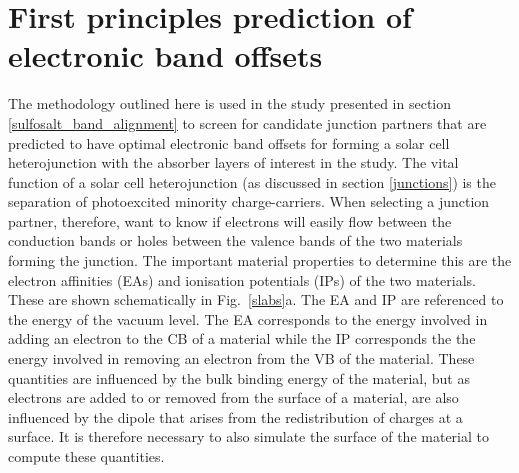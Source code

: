 \documentclass[11pt, twoside]{report}
\begin{document}
\section{First principles prediction of electronic band offsets}\label{band_alignment_methods}
The methodology outlined here is used in the study presented in section \ref{sulfosalt_band_alignment} to screen for candidate junction partners that are predicted to have optimal electronic band offsets for forming a solar cell heterojunction with the absorber layers of interest in the study. The vital function of a solar cell heterojunction (as discussed in section \ref{junctions}) is the separation of photoexcited minority charge-carriers. When selecting a junction partner, therefore, want to know if electrons will easily flow between the conduction bands or holes between the valence bands of the two materials forming the junction. The important material properties to determine this are the electron affinities (EAs) and ionisation potentials (IPs) of the two materials. These are shown schematically in Fig.~\ref{slabs}a. The EA and IP are referenced to the energy of the vacuum level. The EA corresponds to the energy involved in adding an electron to the CB of a material while the IP corresponds the the energy involved in removing an electron from the VB of the material. These quantities are influenced by the bulk binding energy of the material, but as electrons are added to or removed from the surface of a material, are also influenced by the dipole that arises from the redistribution of charges at a surface. It is therefore necessary to also simulate the surface of the material to compute these quantities.
\end{document}
